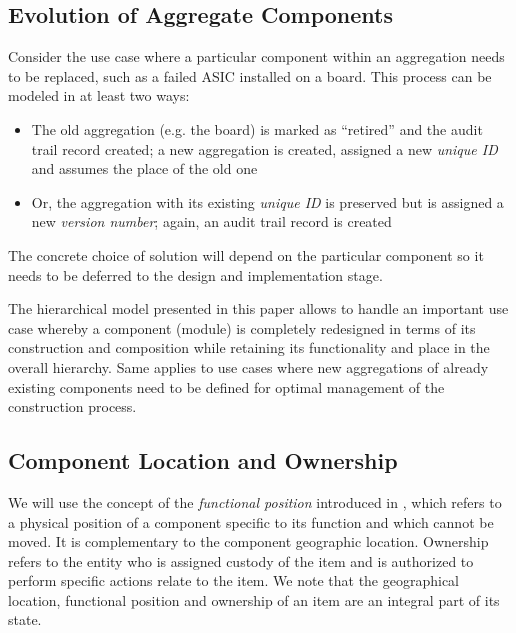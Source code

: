 \documentclass[pdftex,12pt,letter]{article}
\begin{document}
\subsection{Evolution of Aggregate Components}
\label{evolution}
Consider the use case where a particular component within an aggregation needs to be replaced,
such as a failed ASIC installed on a board. This process can be modeled in at least two ways:

\begin{itemize}

\item The old aggregation (e.g. the board) is marked as ``retired'' and the audit trail record created; a new aggregation is
created, assigned a new \textit{unique ID} and assumes the place of the old one

\item Or, the aggregation with its existing \textit{unique ID} is preserved but is assigned a new \textit{version number};
again, an audit trail record is created

\end{itemize}

\noindent The concrete choice of solution will depend on the particular component so it needs to be deferred to the
design and implementation stage.

The hierarchical model presented in this paper allows to handle an important use case whereby a component (module)
is completely redesigned in terms of its construction and composition while retaining its functionality and 
place in the overall hierarchy. Same applies to use cases where new aggregations of already existing components
need to be defined for optimal management of the construction process.



\subsection{Component Location and Ownership}

We will use the concept of the \textit{functional position} introduced in \cite{atlasequipmentdb}, which refers
to a physical position of a component specific to its function and which cannot be moved. It is complementary
to the component geographic location. Ownership refers to the entity who is assigned custody of the item
and is authorized to perform specific actions relate to the item. We note that the geographical location,
functional position and ownership of an item are an integral part of its state.
\end{document}
